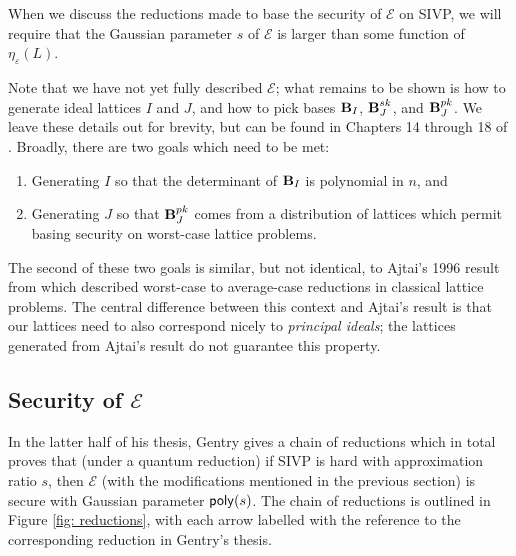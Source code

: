     When we discuss the reductions made to base the security of $\mathcal{E}$ on SIVP, we will require that the Gaussian parameter $s$ of $\mathcal{E}$ is larger than some function of $\eta_\varepsilon(L)$.

    Note that we have not yet fully described $\mathcal{E}$; what remains to be shown is how to generate ideal lattices $I$ and $J$, and how to pick bases $\textbf{B}_I$, $\textbf{B}_J^{sk}$, and $\textbf{B}_J^{pk}$. We leave these details out for brevity, but can be found in Chapters 14 through 18 of \cite{gentry2009fully}. Broadly, there are two goals which need to be met:
    \begin{enumerate}
        \item Generating $I$ so that the determinant of $\textbf{B}_I$ is polynomial in $n$, and
        \item Generating $J$ so that $\textbf{B}_J^{pk}$ comes from a distribution of lattices which permit basing security on worst-case lattice problems.
    \end{enumerate}

    The second of these two goals is similar, but not identical, to Ajtai's 1996 result from \cite{ajtai1996generating} which described worst-case to average-case reductions in classical lattice problems. The central difference between this context and Ajtai's result is that our lattices need to also correspond nicely to \emph{principal ideals}; the lattices generated from Ajtai's result do not guarantee this property.


\subsection{Security of $\mathcal{E}$} \label{sec: security2}
    In the latter half of his thesis, Gentry gives a chain of reductions which in total proves that (under a quantum reduction) if SIVP is hard with approximation ratio $s$, then $\mathcal{E}$ (with the modifications mentioned in the previous section) is secure with Gaussian parameter ${\sf poly}(s)$. The chain of reductions is outlined in Figure \ref{fig: reductions}, with each arrow labelled with the reference to the corresponding reduction in Gentry's thesis.



